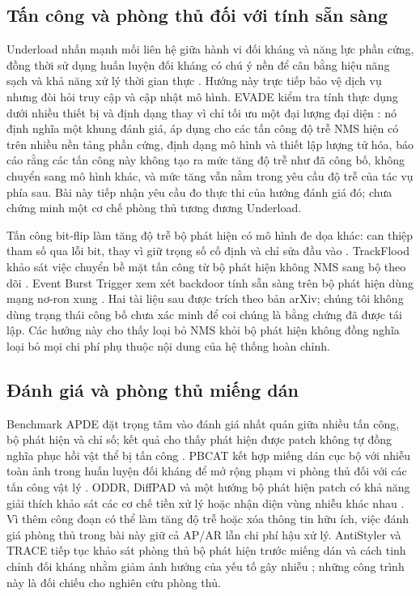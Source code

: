 \documentclass[a4paper,fleqn]{cas-dc}
\begin{document}
\subsection{Tấn công và phòng thủ đối với tính sẵn sàng}
Underload nhấn mạnh mối liên hệ giữa hành vi đối kháng và năng lực phần cứng, đồng thời sử dụng huấn luyện đối kháng có chú ý nền để cân bằng hiệu năng sạch và khả năng xử lý thời gian thực \cite{underload2025}. Hướng này trực tiếp bảo vệ dịch vụ nhưng đòi hỏi truy cập và cập nhật mô hình. EVADE kiểm tra tính thực dụng dưới nhiều thiết bị và định dạng thay vì chỉ tối ưu một đại lượng đại diện \cite{evade2025}: nó định nghĩa một khung đánh giá, áp dụng cho các tấn công độ trễ NMS hiện có trên nhiều nền tảng phần cứng, định dạng mô hình và thiết lập lượng tử hóa, báo cáo rằng các tấn công này không tạo ra mức tăng độ trễ như đã công bố, không chuyển sang mô hình khác, và mức tăng vẫn nằm trong yêu cầu độ trễ của tác vụ phía sau. Bài này tiếp nhận yêu cầu đo thực thi của hướng đánh giá đó; chưa chứng minh một cơ chế phòng thủ tương đương Underload.

Tấn công bit-flip làm tăng độ trễ bộ phát hiện có mô hình đe dọa khác: can thiệp tham số qua lỗi bit, thay vì giữ trọng số cố định và chỉ sửa đầu vào \cite{bitflip2025}. TrackFlood khảo sát việc chuyển bề mặt tấn công từ bộ phát hiện không NMS sang bộ theo dõi \cite{trackflood2026}. Event Burst Trigger xem xét backdoor tính sẵn sàng trên bộ phát hiện dùng mạng nơ-ron xung \cite{eventburst2026}. Hai tài liệu sau được trích theo bản arXiv; chúng tôi không dùng trạng thái công bố chưa xác minh để coi chúng là bằng chứng đã được tái lập. Các hướng này cho thấy loại bỏ NMS khỏi bộ phát hiện không đồng nghĩa loại bỏ mọi chi phí phụ thuộc nội dung của hệ thống hoàn chỉnh.

\subsection{Đánh giá và phòng thủ miếng dán}
Benchmark APDE đặt trọng tâm vào đánh giá nhất quán giữa nhiều tấn công, bộ phát hiện và chỉ số; kết quả cho thấy phát hiện được patch không tự đồng nghĩa phục hồi vật thể bị tấn công \cite{apde2025}. PBCAT kết hợp miếng dán cục bộ với nhiễu toàn ảnh trong huấn luyện đối kháng để mở rộng phạm vi phòng thủ đối với các tấn công vật lý \cite{pbcat2025}. ODDR, DiffPAD và một hướng bộ phát hiện patch có khả năng giải thích khảo sát các cơ chế tiền xử lý hoặc nhận diện vùng nhiễu khác nhau \cite{oddr2025,diffpad2025,unifiedpatchdet2025}. Vì thêm công đoạn có thể làm tăng độ trễ hoặc xóa thông tin hữu ích, việc đánh giá phòng thủ trong bài này giữ cả AP/AR lẫn chi phí hậu xử lý. AntiStyler và TRACE tiếp tục khảo sát phòng thủ bộ phát hiện trước miếng dán và cách tinh chỉnh đối kháng nhằm giảm ảnh hưởng của yếu tố gây nhiễu \cite{antistyler2026,trace2026}; những công trình này là đối chiếu cho nghiên cứu phòng thủ.
\end{document}
